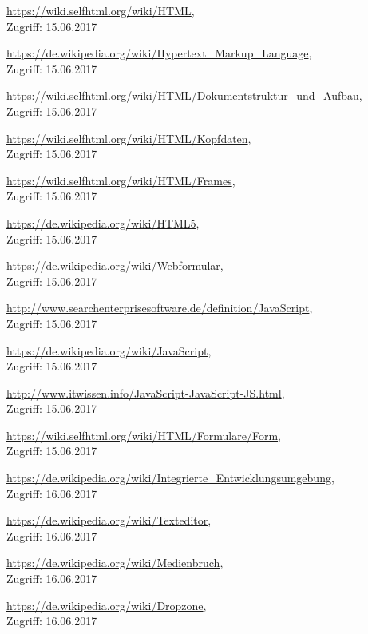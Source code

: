 \documentclass[12pt,a4paper,bibliography=totocnumbered,listof=totocnumbered]{scrartcl}
\begin{document}

\begin{thebibliography}{999}


\url{https://wiki.selfhtml.org/wiki/HTML}, \\
Zugriff: 15.06.2017

\url{https://de.wikipedia.org/wiki/Hypertext\_Markup\_Language},\\
Zugriff: 15.06.2017

\url{https://wiki.selfhtml.org/wiki/HTML/Dokumentstruktur\_und\_Aufbau}, \\
Zugriff: 15.06.2017

\url{https://wiki.selfhtml.org/wiki/HTML/Kopfdaten}, \\
Zugriff: 15.06.2017

\url{https://wiki.selfhtml.org/wiki/HTML/Frames}, \\
Zugriff: 15.06.2017

\url{https://de.wikipedia.org/wiki/HTML5}, \\
Zugriff: 15.06.2017

\url{https://de.wikipedia.org/wiki/Webformular}, \\
Zugriff: 15.06.2017

\url{http://www.searchenterprisesoftware.de/definition/JavaScript}, \\
Zugriff: 15.06.2017

\url{https://de.wikipedia.org/wiki/JavaScript}, \\
Zugriff: 15.06.2017

\url{http://www.itwissen.info/JavaScript-JavaScript-JS.html}, \\
Zugriff: 15.06.2017

\url{https://wiki.selfhtml.org/wiki/HTML/Formulare/Form}, \\
Zugriff: 15.06.2017

\url{https://de.wikipedia.org/wiki/Integrierte_Entwicklungsumgebung}, \\
Zugriff: 16.06.2017

\url{https://de.wikipedia.org/wiki/Texteditor}, \\
Zugriff: 16.06.2017

\url{https://de.wikipedia.org/wiki/Medienbruch}, \\
Zugriff: 16.06.2017

\url{https://de.wikipedia.org/wiki/Dropzone}, \\
Zugriff: 16.06.2017





\end{thebibliography}
\end{document}
